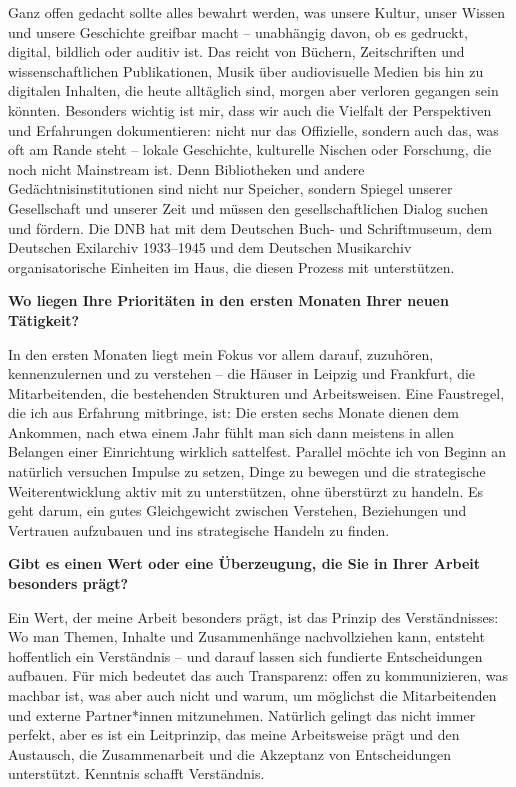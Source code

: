 \documentclass[a4paper,
fontsize=11pt,
oneside,
numbers=noperiodatend,
parskip=half-,
bibliography=totoc,
final
]{scrartcl}
\begin{document}
Ganz offen gedacht sollte alles bewahrt werden, was unsere Kultur, unser
Wissen und unsere Geschichte greifbar macht -- unabhängig davon, ob es
gedruckt, digital, bildlich oder auditiv ist. Das reicht von Büchern,
Zeitschriften und wissenschaftlichen Publikationen, Musik über
audiovisuelle Medien bis hin zu digitalen Inhalten, die heute alltäglich
sind, morgen aber verloren gegangen sein könnten. Besonders wichtig ist
mir, dass wir auch die Vielfalt der Perspektiven und Erfahrungen
dokumentieren: nicht nur das Offizielle, sondern auch das, was oft am
Rande steht -- lokale Geschichte, kulturelle Nischen oder Forschung, die
noch nicht Mainstream ist. Denn Bibliotheken und andere
Gedächtnisinstitutionen sind nicht nur Speicher, sondern Spiegel unserer
Gesellschaft und unserer Zeit und müssen den gesellschaftlichen Dialog
suchen und fördern. Die DNB hat mit dem Deutschen Buch- und
Schriftmuseum, dem Deutschen Exilarchiv 1933--1945 und dem Deutschen
Musikarchiv organisatorische Einheiten im Haus, die diesen Prozess mit
unterstützen.

\textbf{Wo liegen Ihre Prioritäten in den ersten Monaten Ihrer neuen
Tätigkeit?}

In den ersten Monaten liegt mein Fokus vor allem darauf, zuzuhören,
kennenzulernen und zu verstehen -- die Häuser in Leipzig und Frankfurt,
die Mitarbeitenden, die bestehenden Strukturen und Arbeitsweisen. Eine
Faustregel, die ich aus Erfahrung mitbringe, ist: Die ersten sechs
Monate dienen dem Ankommen, nach etwa einem Jahr fühlt man sich dann
meistens in allen Belangen einer Einrichtung wirklich sattelfest.
Parallel möchte ich von Beginn an natürlich versuchen Impulse zu setzen,
Dinge zu bewegen und die strategische Weiterentwicklung aktiv mit zu
unterstützen, ohne überstürzt zu handeln. Es geht darum, ein gutes
Gleichgewicht zwischen Verstehen, Beziehungen und Vertrauen aufzubauen
und ins strategische Handeln zu finden.

\textbf{Gibt es einen Wert oder eine Überzeugung, die Sie in Ihrer
Arbeit besonders prägt?}

Ein Wert, der meine Arbeit besonders prägt, ist das Prinzip des
Verständnisses: Wo man Themen, Inhalte und Zusammenhänge nachvollziehen
kann, entsteht hoffentlich ein Verständnis -- und darauf lassen sich
fundierte Entscheidungen aufbauen. Für mich bedeutet das auch
Transparenz: offen zu kommunizieren, was machbar ist, was aber auch
nicht und warum, um möglichst die Mitarbeitenden und externe
Partner*innen mitzunehmen. Natürlich gelingt das nicht immer perfekt,
aber es ist ein Leitprinzip, das meine Arbeitsweise prägt und den
Austausch, die Zusammenarbeit und die Akzeptanz von Entscheidungen
unterstützt. Kenntnis schafft Verständnis.
\end{document}
